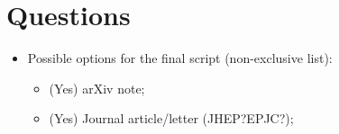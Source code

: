 
\section{Questions}
\begin{itemize}
\item {Possible options for  the final script (non-exclusive list):
\begin{itemize}
\item (Yes) arXiv note;
\item (Yes) Journal article/letter (JHEP?EPJC?);
\end{itemize}
}
\end{itemize}
\clearpage
\newpage
